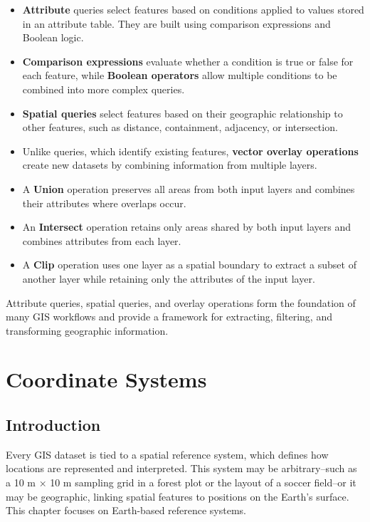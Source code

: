 \documentclass[
  letterpaper,
]{book}
\providecommand{\tightlist}{%
  \setlength{\itemsep}{0pt}\setlength{\parskip}{0pt}}
\begin{document}
\begin{itemize}
\tightlist
\item
  \textbf{Attribute} queries select features based on conditions applied
  to values stored in an attribute table. They are built using
  comparison expressions and Boolean logic.
\item
  \textbf{Comparison expressions} evaluate whether a condition is true
  or false for each feature, while \textbf{Boolean operators} allow
  multiple conditions to be combined into more complex queries.
\item
  \textbf{Spatial queries} select features based on their geographic
  relationship to other features, such as distance, containment,
  adjacency, or intersection.
\item
  Unlike queries, which identify existing features, \textbf{vector
  overlay operations} create new datasets by combining information from
  multiple layers.
\item
  A \textbf{Union} operation preserves all areas from both input layers
  and combines their attributes where overlaps occur.
\item
  An \textbf{Intersect} operation retains only areas shared by both
  input layers and combines attributes from each layer.
\item
  A \textbf{Clip} operation uses one layer as a spatial boundary to
  extract a subset of another layer while retaining only the attributes
  of the input layer.
\end{itemize}

Attribute queries, spatial queries, and overlay operations form the
foundation of many GIS workflows and provide a framework for extracting,
filtering, and transforming geographic information.

\chapter{Coordinate Systems}\label{chp09_0}

\section{Introduction}\label{introduction-8}

Every GIS dataset is tied to a spatial reference system, which defines
how locations are represented and interpreted. This system may be
arbitrary--such as a 10 m × 10 m sampling grid in a forest plot or the
layout of a soccer field--or it may be geographic, linking spatial
features to positions on the Earth's surface. This chapter focuses on
Earth-based reference systems.
\end{document}
